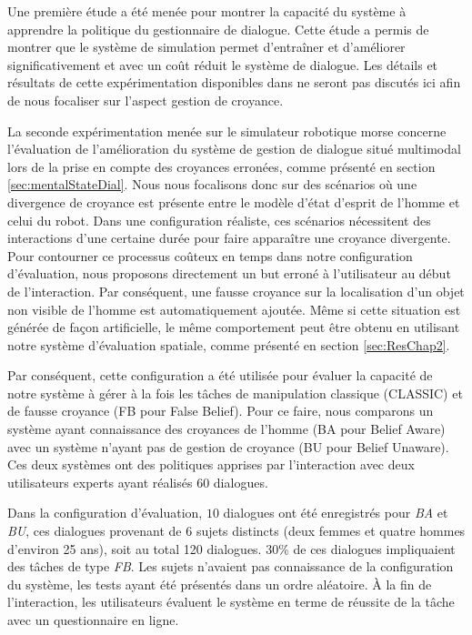 \documentclass[a4paper,11pt,twoside]{StyleThese}
\begin{document}
Une première étude a été menée pour montrer la capacité du système à apprendre la politique du gestionnaire de dialogue. Cette étude a permis de montrer que le système de simulation permet d'entraîner et d'améliorer significativement et avec un coût réduit le système de dialogue. Les détails et résultats de cette expérimentation disponibles dans \cite{simpar_2014} ne seront pas discutés ici afin de nous focaliser sur l'aspect gestion de croyance.

La seconde expérimentation menée sur le simulateur robotique morse concerne l'évaluation de l'amélioration du système de gestion de dialogue situé multimodal lors de la prise en compte des croyances erronées, comme présenté en section \ref{sec:mentalStateDial}.
Nous nous focalisons donc sur des scénarios où une divergence de croyance est présente entre le modèle d'état d'esprit de l'homme et celui du robot. 
Dans une configuration réaliste, ces scénarios nécessitent des interactions d'une certaine durée pour faire apparaître une croyance divergente. Pour contourner ce processus coûteux en temps dans notre configuration d'évaluation, nous proposons directement un but erroné à l'utilisateur au début de l'interaction. 
Par conséquent, une fausse croyance sur la localisation d'un objet non visible de l'homme est automatiquement ajoutée. Même si cette situation est générée de façon artificielle, le même comportement peut être obtenu en utilisant notre système d'évaluation spatiale, comme présenté en section \ref{sec:ResChap2}.

Par conséquent, cette configuration a été utilisée pour évaluer la capacité de notre système à gérer à la fois les tâches de manipulation classique (CLASSIC) et de fausse croyance (FB pour False Belief).
Pour ce faire, nous comparons un système ayant connaissance des croyances de l'homme (BA pour Belief Aware) avec un système n'ayant pas de gestion de croyance (BU pour Belief Unaware). Ces deux systèmes ont des politiques apprises par l'interaction avec deux utilisateurs experts ayant réalisés $60$ dialogues.

Dans la configuration d'évaluation, $10$ dialogues ont été enregistrés pour \textit{BA} et \textit{BU}, ces dialogues provenant de 6 sujets distincts (deux femmes et quatre hommes d'environ 25 ans), soit au total 120 dialogues. $30$\% de ces dialogues impliquaient des tâches de type \textit{FB}. Les sujets n'avaient pas connaissance de la configuration du système, les tests ayant été présentés dans un ordre aléatoire. À la fin de l'interaction, les utilisateurs évaluent le système en terme de réussite de la tâche avec un questionnaire en ligne.
\end{document}
